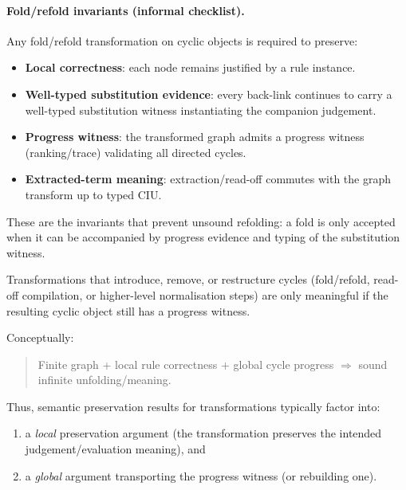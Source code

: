 \paragraph{Fold/refold invariants (informal checklist).}
Any fold/refold transformation on cyclic objects is required to preserve:
\begin{itemize}
\item \textbf{Local correctness}: each node remains justified by a rule instance.
\item \textbf{Well-typed substitution evidence}: every back-link continues to carry a well-typed substitution witness instantiating the companion judgement.
\item \textbf{Progress witness}: the transformed graph admits a progress witness (ranking/trace) validating all directed cycles.
\item \textbf{Extracted-term meaning}: extraction/read-off commutes with the graph transform up to typed CIU.
\end{itemize}
These are the invariants that prevent unsound refolding: a fold is only accepted when it can be accompanied by progress evidence and typing of the substitution witness.

Transformations that introduce, remove, or restructure cycles (fold/refold, read-off compilation, or higher-level normalisation steps) are only meaningful if the resulting cyclic object still has a progress witness.

Conceptually:
\begin{quote}
Finite graph + local rule correctness + global cycle progress \(\Rightarrow\) sound infinite unfolding/meaning.
\end{quote}

Thus, semantic preservation results for transformations typically factor into:
\begin{enumerate}[label=(\arabic*)]
\item a \emph{local} preservation argument (the transformation preserves the intended judgement/evaluation meaning), and
\item a \emph{global} argument transporting the progress witness (or rebuilding one).
\end{enumerate}
